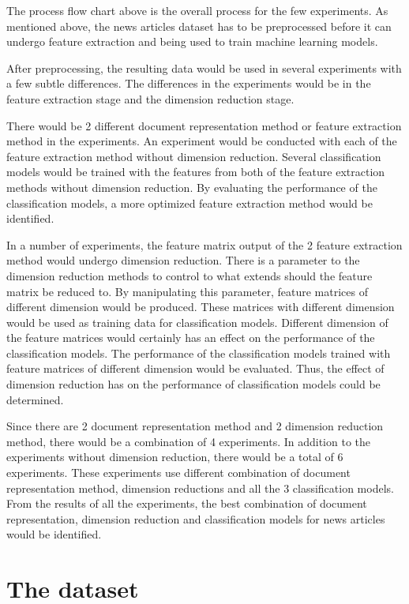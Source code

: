 The process flow chart above is the overall process for the few experiments. As mentioned above, the news articles dataset has to be preprocessed before it can undergo feature extraction and being used to train machine learning models.

After preprocessing, the resulting data would be used in several experiments with a few subtle differences.
The differences in the experiments would be in the feature extraction stage and the dimension reduction stage. 

There would be 2 different document representation method or feature extraction method in the experiments. An experiment would be conducted with each of the feature extraction method without dimension reduction. Several classification models would be trained with the features from both of the feature extraction methods without dimension reduction. By evaluating the performance of the classification models, a more optimized feature extraction method would be identified.

In a number of experiments, the feature matrix output of the 2 feature extraction method would undergo dimension reduction. There is a parameter to the dimension reduction methods to control to what extends should the feature matrix be reduced to. By manipulating this parameter, feature matrices of different dimension would be produced. These matrices with different dimension would be used as training data for classification models. Different dimension of the feature matrices would certainly has an effect on the performance of the classification models. The performance of the classification models trained with feature matrices of different dimension would be evaluated. Thus, the effect of dimension reduction has on the performance of classification models could be determined.

Since there are 2 document representation method and 2 dimension reduction method, there would be a combination of 4 experiments. In addition to the experiments without dimension reduction, there would be a total of 6 experiments. These experiments use different combination of document representation method, dimension reductions and all the 3 classification models. From the results of all the experiments, the best combination of document representation, dimension reduction and classification models for news articles would be identified.

\section{The dataset}
\graphicspath{{./images/}}

